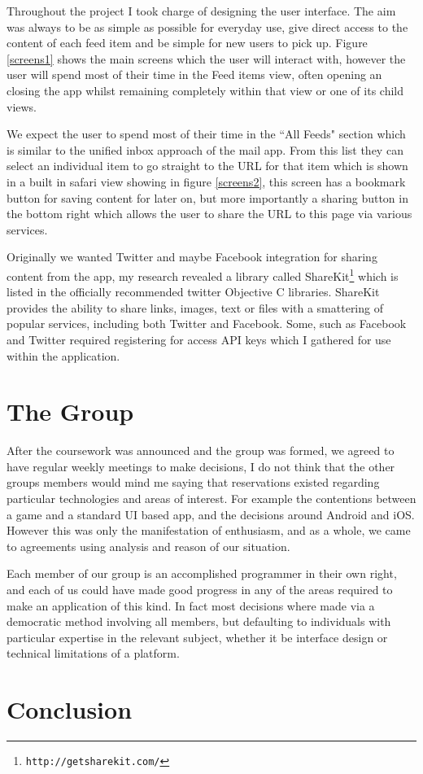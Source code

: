 \documentclass[a4paper,11pt]{article}
\begin{document}
	Throughout the project I took charge of designing the user interface. The aim was always to be as simple as possible for everyday use, give direct access to the content of each feed item and be simple for new users to pick up. Figure \ref{screens1} shows the main screens which the user will interact with, however the user will spend most of their time in the Feed items view, often opening an closing the app whilst remaining completely within that view or one of its child views.
	
	We expect the user to spend most of their time in the ``All Feeds" section which is similar to the unified inbox approach of the mail app. From this list they can select an individual item to go straight to the URL for that item which is shown in a built in safari view showing in figure \ref{screens2}, this screen has a bookmark button for saving content for later on, but more importantly a sharing button in the bottom right which allows the user to share the URL to this page via various services.
	
	Originally we wanted Twitter and maybe Facebook integration for sharing content from the app, my research revealed a library called ShareKit\footnote{\texttt{http://getsharekit.com/}} which is listed in the officially recommended twitter Objective C libraries. ShareKit provides the ability to share links, images, text or files with a smattering of popular services, including both Twitter and Facebook. Some, such as Facebook and Twitter required registering for access API keys which I gathered for use within the application.
	
	\section{The Group}
    
	After the coursework was announced and the group was formed, we agreed to have regular weekly meetings to make decisions, I do not think that the other groups members would mind me saying that reservations existed regarding particular technologies and areas of interest. For example the contentions between a game and a standard UI based app, and the decisions around Android and iOS. However this was only the manifestation of enthusiasm, and as a whole, we came to agreements using analysis and reason of our situation.
	
	Each member of our group is an accomplished programmer in their own right, and each of us could have made good progress in any of the areas required to make an application of this kind. In fact most decisions where made via a democratic method involving all members, but defaulting to individuals with particular expertise in the relevant subject, whether it be interface design or technical limitations of a platform.
	
	\section{Conclusion}
	
	
\end{document}
